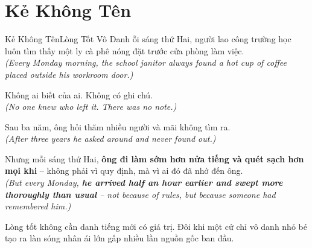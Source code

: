 \section{Kẻ Không Tên}
\begin{truyen}{Kẻ Không Tên}{Lòng Tốt Vô Danh}
ỗi sáng thứ Hai, người lao công trường học luôn tìm thấy một ly cà phê nóng đặt trước cửa phòng làm việc.\\
\textit{(Every Monday morning, the school janitor always found a hot cup of coffee placed outside his workroom door.)}

Không ai biết của ai. Không có ghi chú.\\
\textit{(No one knew who left it. There was no note.)}

Sau ba năm, ông hỏi thăm nhiều người và mãi không tìm ra.\\
\textit{(After three years he asked around and never found out.)}

Nhưng mỗi sáng thứ Hai, \textbf{ông đi làm sớm hơn nửa tiếng và quét sạch hơn mọi khi} – không phải vì quy định, mà vì ai đó đã nhớ đến ông.\\
\textit{(But every Monday, \textbf{he arrived half an hour earlier and swept more thoroughly than usual} – not because of rules, but because someone had remembered him.)}
\end{truyen}
\begin{baihoc}
  Lòng tốt không cần danh tiếng mới có giá trị. Đôi khi một cử chỉ vô danh nhỏ bé tạo ra làn sóng nhân ái lớn gấp nhiều lần nguồn gốc ban đầu.
\end{baihoc}

